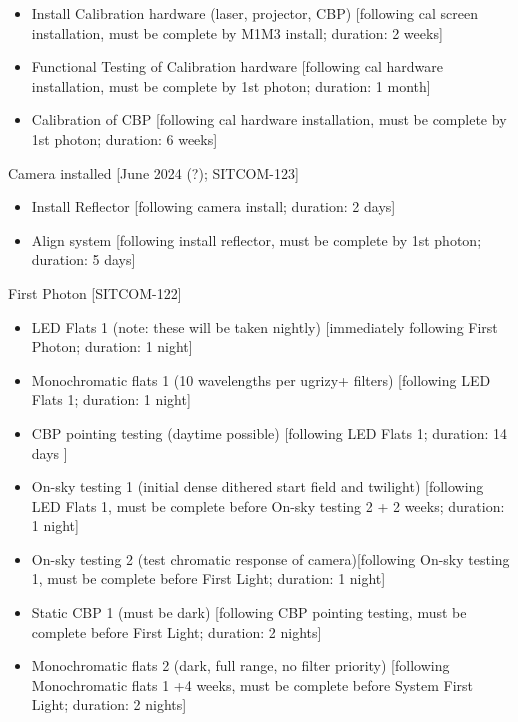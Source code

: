 \documentclass[SE,authoryear,toc,lsstdraft]{lsstdoc}
\begin{document}
\begin{itemize}

  \item Install Calibration hardware (laser, projector, CBP) [following cal screen installation, must be complete by M1M3 install; duration: 2 weeks]

  \item Functional Testing of Calibration hardware [following cal hardware installation, must be complete by 1st photon; duration: 1 month]

  \item Calibration of CBP [following cal hardware installation, must be complete by 1st photon; duration: 6 weeks]

\end{itemize}

Camera installed [June 2024 (?); SITCOM-123]

\begin{itemize}

  \item Install Reflector [following camera install; duration: 2 days]

  \item Align system [following install reflector, must be complete by 1st photon; duration: 5 days]

\end{itemize}

First Photon [SITCOM-122]

\begin{itemize}

  \item LED Flats 1 (note: these will be taken nightly) [immediately following First Photon; duration: 1 night]

  \item Monochromatic flats 1 (10 wavelengths per ugrizy+ filters) [following LED Flats 1; duration: 1 night]

  \item CBP pointing testing (daytime possible) [following LED Flats 1; duration: 14 days ]

  \item On-sky testing 1 (initial dense dithered start field and twilight) [following LED Flats 1, must be complete before On-sky testing 2 + 2 weeks; duration: 1 night]

  \item On-sky testing 2 (test chromatic response of camera)[following On-sky testing 1, must be complete before First Light; duration: 1 night]

  \item Static CBP 1 (must be dark) [following CBP pointing testing, must be complete before First Light; duration: 2 nights]

  \item Monochromatic flats 2 (dark, full range, no filter priority) [following Monochromatic flats 1 +4 weeks, must be complete before System First Light; duration: 2 nights]

\end{itemize}
\end{document}
